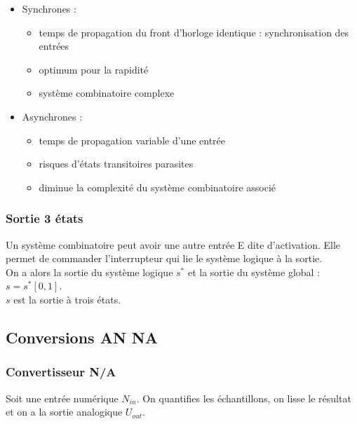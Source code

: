 \documentclass[../main.tex]{subfiles}
\begin{document}
\begin{itemize}
    \item Synchrones : \begin{itemize}
        \item temps de propagation du front d'horloge identique : synchronisation des entrées\\
        \item optimum pour la rapidité\\
        \item système combinatoire complexe\\
    \end{itemize}
    \item Asynchrones : \begin{itemize}
        \item temps de propagation variable d'une entrée\\
        \item risques d'états transitoires parasites\\
        \item diminue la complexité du système combinatoire associé\\
    \end{itemize}
\end{itemize}

\subsubsection{Sortie 3 états}
Un système combinatoire peut avoir une autre entrée E dite d'activation. Elle permet de commander l'interrupteur qui lie le système logique à la sortie.\\

On a alors la sortie du système logique $s^*$ et la sortie du système global : $s = s^* [0,1]$.\\
$s$ est la sortie à trois états.\\

\subsection{Conversions AN NA}
\subsubsection{Convertisseur N/A}
Soit une entrée numérique $N_{in}$. On quantifies les échantillons, on lisse le résultat et on a la sortie analogique $U_{out}$.\\
\end{document}
